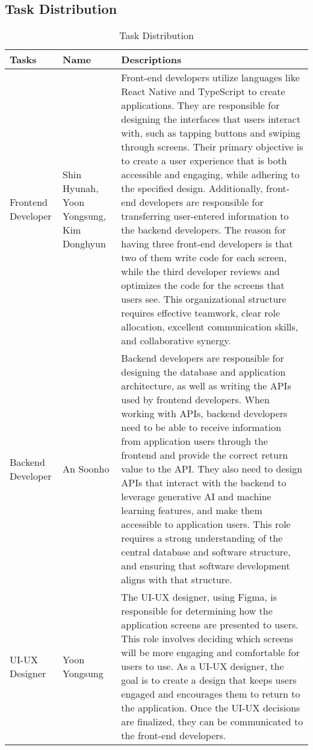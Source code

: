 \documentclass[conference, a4paper]{IEEEtran}
\begin{document}
\subsection{Task Distribution}

\begin{table}[h]
\centering
\caption{Task Distribution}
\setlength{\tabcolsep}{12pt}
\renewcommand{\arraystretch}{1.5}
\begin{tabular}{|p{1cm}|p{1.5cm}|p{4cm}|}
\hline Tasks & Name & Descriptions\\ \hline
Frontend Developer & Shin Hyunah, Yoon Yongsung, Kim Donghyun & Front-end developers utilize languages like React Native and TypeScript to create applications. They are responsible for designing the interfaces that users interact with, such as tapping buttons and swiping through screens. Their primary objective is to create a user experience that is both accessible and engaging, while adhering to the specified design. Additionally, front-end developers are responsible for transferring user-entered information to the backend developers. The reason for having three front-end developers is that two of them write code for each screen, while the third developer reviews and optimizes the code for the screens that users see. This organizational structure requires effective teamwork, clear role allocation, excellent communication skills, and collaborative synergy.\\
\hline
Backend Developer & An Soonho & Backend developers are responsible for designing the database and application architecture, as well as writing the APIs used by frontend developers. When working with APIs, backend developers need to be able to receive information from application users through the frontend and provide the correct return value to the API. They also need to design APIs that interact with the backend to leverage generative AI and machine learning features, and make them accessible to application users. This role requires a strong understanding of the central database and software structure, and ensuring that software development aligns with that structure.\\
\hline
UI-UX Designer & Yoon Yongsung & The UI-UX designer, using Figma, is responsible for determining how the application screens are presented to users. This role involves deciding which screens will be more engaging and comfortable for users to use. As a UI-UX designer, the goal is to create a design that keeps users engaged and encourages them to return to the application. Once the UI-UX decisions are finalized, they can be communicated to the front-end developers.\\
\hline
\end{tabular}
\end{table}
\end{document}
